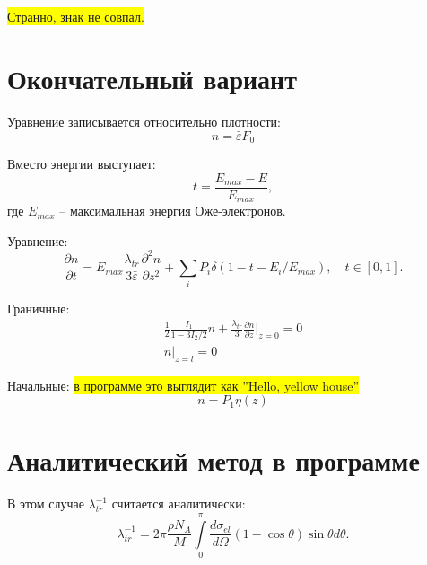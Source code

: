 \documentclass[a4paper,12pt]{article} %
\newcommand{\dff}[2]{\frac{\partial #1}{\partial #2}}
\newcommand{\Dff}[2]{\frac{d #1}{d #2}}
\newcommand{\dfn}[3]{\frac{\partial^#1 #2}{\partial #3^#1}}
\newcommand{\eps}{\varepsilon}
\begin{document}
\colorbox{yellow}{Странно, знак не совпал.}

\clearpage
\section{Окончательный вариант}

Уравнение записывается относительно плотности:
\begin{equation}
    n = \bar{\eps} F_0
\end{equation}

Вместо энергии выступает:
\begin{equation}
    t = \frac{E_{max} - E}{E_{max}},
\end{equation}
где $E_{max}$ -- максимальная энергия Оже-электронов.

Уравнение:
\begin{equation}
    \dff{n}{t} = E_{max}\frac{\lambda_{tr}}{3\bar{\eps}}\dfn{2}{n}{z} + \sum_{i} P_i\delta(1 - t - E_i/E_{max}), \quad t\in[0, 1].
\end{equation}

Граничные:
\begin{gather}
    \frac{1}{2} \frac{I_1}{1 - 3 I_2/2} n + \frac{\lambda_{tr}}{3} \dff{n}{z} \Bigg|_{z = 0} = 0 \\
    n\Bigg|_{z = l} = 0
\end{gather}

Начальные: \colorbox{yellow}{в программе это выглядит как ''Hello, yellow house''}
\begin{equation}
    n = P_1 \eta (z)
\end{equation}

\section{Аналитический метод в программе}

В этом случае $\lambda_{tr}^{-1}$ считается аналитически:
\begin{equation}\label{eq: ltr}
    \lambda_{tr}^{-1} =
    2 \pi \frac{\rho N_A}{M} \int\limits_{0}^{\pi}
    \Dff{\sigma_{el}}{\Omega} (1 - \cos \theta) \sin \theta d \theta.
\end{equation}
\end{document}
